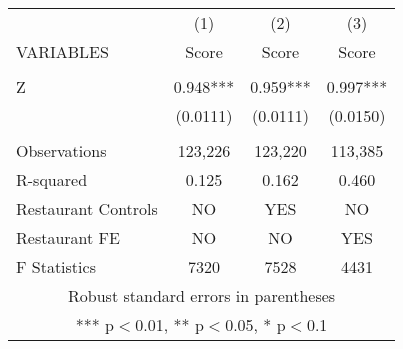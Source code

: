 \begin{tabular}{lccc} \hline
 & (1) & (2) & (3) \\
VARIABLES & Score & Score & Score \\ \hline
 &  &  &  \\
Z & 0.948*** & 0.959*** & 0.997*** \\
 & (0.0111) & (0.0111) & (0.0150) \\
 &  &  &  \\
Observations & 123,226 & 123,220 & 113,385 \\
R-squared & 0.125 & 0.162 & 0.460 \\
Restaurant Controls & NO & YES & NO \\
Restaurant FE & NO & NO & YES \\
 F Statistics & 7320 & 7528 & 4431 \\ \hline
\multicolumn{4}{c}{ Robust standard errors in parentheses} \\
\multicolumn{4}{c}{ *** p$<$0.01, ** p$<$0.05, * p$<$0.1} \\
\end{tabular}
